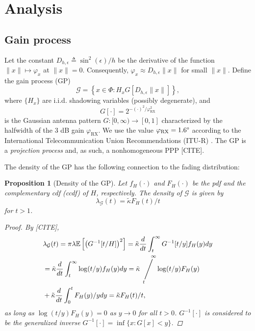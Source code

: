 \documentclass[conference]{IEEEtran}
\newcommand{\viiva}{\mathop{\Bigg/}}
\newcommand{\sij}[3]{\viiva\limits_{\hspace*{-5mm}{#1}}^{\hspace*{5mm}{#2}}{#3}}
\theoremstyle{definition}
\theoremstyle{plain}
\newtheorem{prop}[thm4]{Proposition}
\begin{document}
      
          \section{Analysis}

          \subsection{Gain process}
          Let the constant $D_{h,\epsilon} \triangleq \sin^2(\epsilon)/h$ be the derivative of the function $\|x\| \mapsto \varphi_x $ at $\|x\| =0$. Consequently, $\varphi_x \approx D_{h,\epsilon}\|x\|$ for small $\|x\|$.
          Define the gain process (GP)
          \begin{equation}
            \mathcal{G} = \left\{x \in \Phi : H_x G[D_{h,\epsilon}\|x\|] \right\},
          \end{equation}
          where $\{H_x\}$ are i.i.d. shadowing variables (possibly degenerate), and 
          \begin{equation}
            G[\cdot] = 2^{-(\cdot)^2/\varphi^2_{\text{RX}}}
          \end{equation}
          is the Gaussian antenna pattern $G:[0,\infty) \rightarrow [0,1]$ characterized by the halfwidth of the $3$ dB gain $\varphi_{\text{RX}}$. We use the value $\varphi_{\text{RX}} = 1.6 \degree$ according to the International Telecommunication Union Recommendations (ITU-R) \cite{ITURS1528}. The GP is a \textit{projection process} and, as such, a nonhomogeneous PPP [CITE].

            The density of the GP has the following connection to the fading distribution:

          \begin{prop}[Density of the GP]
            Let $f_H(\cdot)$ and $F_H(\cdot)$ be the pdf and the complementary cdf (ccdf) of $H$, respectively. The density of $\mathcal{G}$ is given by
            \begin{equation}
              \label{eq:GPdensity}
              \lambda_{\mathcal{G}}(t)= \tilde{\kappa}F_H(t)/t
            \end{equation}
            for $t>1$.
            \begin{proof}
              By [CITE],
              \begin{align*}
                &\lambda_{\mathcal{G}}(t) \overset{}{=} \pi \lambda \mathbb{E}\left[\left( G^{-1}[t/H] \right)^2 \right]=\tilde{\kappa}\frac{d}{dt} \int_t^{\infty} G^{-1}[t/y]f_H(y) dy\\
                &  = \tilde{\kappa}\frac{d}{dt} \int_t^{\infty} \log(t/y)f_H(y) dy = \tilde{\kappa} \sij{t}{\infty} \log(t/y)F_H(y)\\ 
                & + \tilde{\kappa} \frac{d}{dt} \int_0^{t}F_H(y)/y dy =  \tilde{\kappa}F_H(t)/t,
              \end{align*}
            as long as $\log(t/y) F_H(y) =0$ as $y \rightarrow 0$ for all $t>0$.  $G^{-1}[\cdot]$ is considered to be the generalized inverse $G^{-1}[\cdot] = \inf \{x:G[x]<y\}$.
              \end{proof}
          \end{prop}
\end{document}
